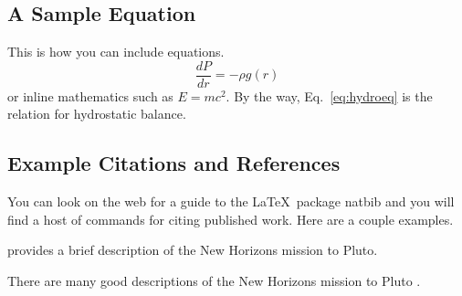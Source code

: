 \documentclass[twoside,fontsize=12pt,
     bibliography=totoc, %
     listof=totoc,       %
     index=totoc,        %
     onehalfspacing      %
]{SPAProjectReport}
\begin{document}
\subsection{A Sample Equation}
This is how you can include equations.
\begin{equation}
   \label{eq:hydroeq}
   \frac{dP}{dr} = -\rho g(r)
\end{equation}
or inline mathematics such as $E=mc^2$.
By the way, Eq.~\ref{eq:hydroeq} is the relation for hydrostatic balance.

\subsection{Example Citations and References}

You can look on the web for a guide to the \LaTeX\ package natbib and
you will find a host of commands for citing published work.  Here are
a couple examples.

\citet{NHDescription} provides a brief description of the New
Horizons mission to Pluto.

There are many good descriptions of the New Horizons mission to Pluto
\citep[see e.g.,][]{NHDescription}.


\begin{singlespace}%

\end{singlespace}
\end{document}
